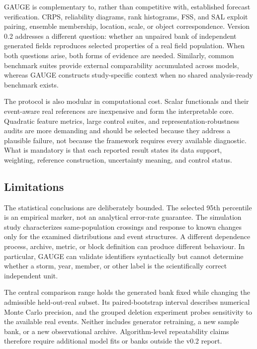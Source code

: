 \documentclass[gmd, manuscript]{copernicus}
\begin{document}
GAUGE is complementary to, rather than competitive with, established forecast
verification. CRPS, reliability diagrams, rank histograms, FSS, and SAL exploit
pairing, ensemble membership, location, scale, or object correspondence. Version 0.2
addresses a different question: whether an unpaired bank of independent generated
fields reproduces selected properties of a real field population. When both
questions arise, both forms of evidence are needed. Similarly, common benchmark
suites provide external comparability accumulated across models, whereas GAUGE
constructs study-specific context when no shared analysis-ready benchmark exists.

The protocol is also modular in computational cost. Scalar functionals and their
event-aware real references are inexpensive and form the interpretable core.
Quadratic feature metrics, large control suites, and representation-robustness audits
are more demanding and should be selected because they address a plausible failure,
not because the framework requires every available diagnostic. What is mandatory is
that each reported result states its data support, weighting, reference construction,
uncertainty meaning, and control status.

\subsection{Limitations}

The statistical conclusions are deliberately bounded. The selected 95th percentile
is an empirical marker, not an analytical error-rate guarantee. The simulation study
characterizes same-population crossings and response to known changes only for the
examined distributions and event structures. A different dependence process,
archive, metric, or block definition can produce different behaviour. In particular,
GAUGE can validate identifiers syntactically but cannot determine whether a storm,
year, member, or other label is the scientifically correct independent unit.

The central comparison range holds the generated bank fixed while changing the
admissible held-out-real subset. Its paired-bootstrap interval describes numerical
Monte Carlo precision, and the grouped deletion experiment probes sensitivity to the
available real events. Neither includes generator retraining, a new sample bank, or a
new observational archive. Algorithm-level repeatability claims therefore require
additional model fits or banks outside the v0.2 report.
\end{document}
